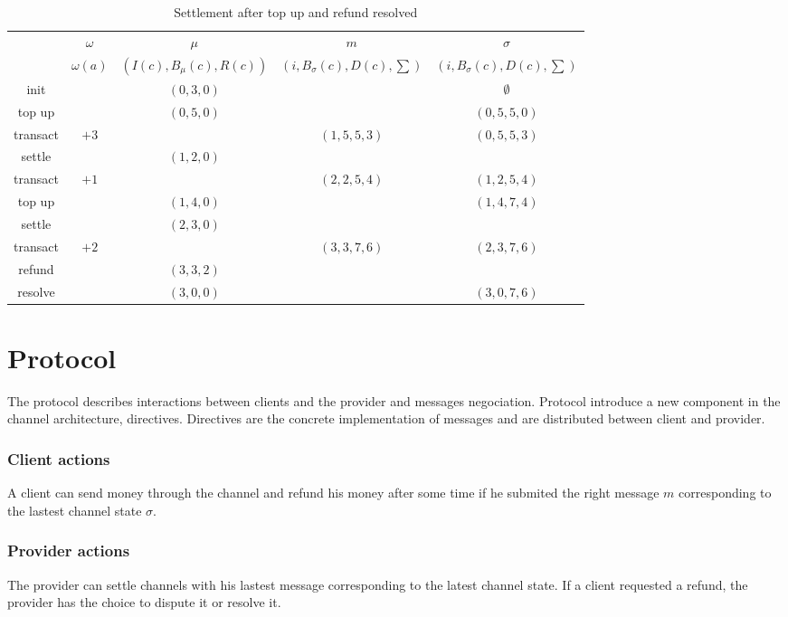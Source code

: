 \documentclass{llncs}
\begin{document}
\begin{table}[t]
  \begin{tabularx}{\textwidth}{| S | S | C | C | C |}
       & $\omega$ & $\mu$ & $m$ & $\sigma$ \\ 
       & $\omega(a)$ & $(I(c), B_\mu(c),R(c))$ & $(i, B_\sigma(c), D(c), \sum)$ & $(i, B_\sigma(c), D(c), \sum)$ \\
  \hhline{-====}
      init & & $(0,3,0)$ & & $\emptyset$ \\
      top up & & $(0,5,0)$ & & $(0, 5, 5, 0)$ \\
      transact & $+3$ & & $(1, 5, 5, 3)$ & $(0, 5, 5, 3)$ \\
      settle & & $(1,2,0)$ & & \\
      transact & $+1$ & & $(2, 2, 5, 4)$ & $(1, 2, 5, 4)$ \\
      top up & & $(1,4,0)$ & & $(1, 4, 7, 4)$ \\
      settle & & $(2,3,0)$ & & \\
      transact & $+2$ & & $(3, 3, 7, 6)$ & $(2, 3, 7, 6)$ \\
      refund & & $(3,3,2)$ & & \\
      resolve & & $(3,0,0)$ & & $(3,0,7,6)$ \\
  \end{tabularx}
  \medskip
  \caption{Settlement after top up and refund resolved}
\end{table}

\section{Protocol} The protocol describes interactions between clients and the provider and messages negociation. Protocol introduce a new component in the channel architecture, directives. Directives are the concrete implementation of messages and are distributed between client and provider.

\subsubsection{Client actions} A client can send money through the channel and refund his money after some time if he submited the right message $m$ corresponding to the lastest channel state $\sigma$.

\subsubsection{Provider actions} The provider can settle channels with his lastest message corresponding to the latest channel state. If a client requested a refund, the provider has the choice to dispute it or resolve it.
\end{document}
